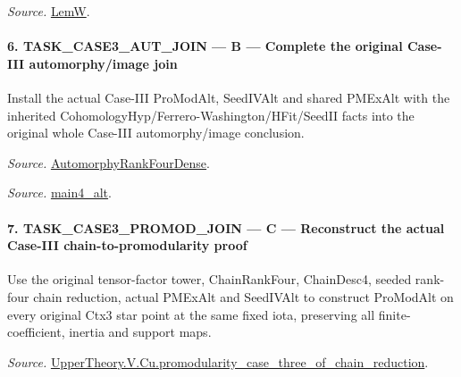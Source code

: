 \documentclass[11pt,a4paper]{article}
\numberwithin{equation}{section}
\theoremstyle{remark}\newtheorem{remark}[theorem]{Remark}
\begin{document}
\emph{Source.} \href{https://github.com/CocoSgt/riemann-hypothesis-lean/blob/7cbf7a0c32fca1badf05931879a37c3f8a2b03b4/src/Development/AutomorphicArithmetic/AutomorphicVarieties/AutomorphicCases/AutomorphyUnramifiedCoefficients.lean#L19-L22}{LemW}.



\paragraph{6. TASK\_\allowbreak CASE3\_\allowbreak AUT\_\allowbreak JOIN — B — Complete the original Case-III automorphy/image join}

Install the actual Case-III ProModAlt, SeedIVAlt and shared PMExAlt with the inherited CohomologyHyp/Ferrero-Washington/HFit/SeedII facts into the original whole Case-III automorphy/image conclusion.

\emph{Source.} \href{https://github.com/CocoSgt/riemann-hypothesis-lean/blob/7cbf7a0c32fca1badf05931879a37c3f8a2b03b4/src/Development/AutomorphicArithmetic/AutomorphicVarieties/ModularityArgument/ThresholdArguments/DenseThresholdCases/PromodularityCaseThree.lean#L43-L44}{AutomorphyRankFourDense}.

\emph{Source.} \href{https://github.com/CocoSgt/riemann-hypothesis-lean/blob/7cbf7a0c32fca1badf05931879a37c3f8a2b03b4/src/Development/AutomorphicArithmetic/AutomorphicVarieties/ModularityArgument/ThresholdArguments/DenseThresholdCases/CuFinal.lean#L44-L44}{main4\_\allowbreak alt}.



\paragraph{7. TASK\_\allowbreak CASE3\_\allowbreak PROMOD\_\allowbreak JOIN — C — Reconstruct the actual Case-III chain-to-promodularity proof}

Use the original tensor-factor tower, ChainRankFour, ChainDesc4, seeded rank-four chain reduction, actual PMExAlt and SeedIVAlt to construct ProModAlt on every original Ctx3 star point at the same fixed iota, preserving all finite-coefficient, inertia and support maps.

\emph{Source.} \href{https://github.com/CocoSgt/riemann-hypothesis-lean/blob/7cbf7a0c32fca1badf05931879a37c3f8a2b03b4/src/Development/AutomorphicArithmetic/AutomorphicVarieties/ModularityArgument/ThresholdArguments/DenseThresholdCases/PromodularityCaseThreeOfLemmas.lean#L131-L153}{UpperTheory.V.Cu.promodularity\_\allowbreak case\_\allowbreak three\_\allowbreak of\_\allowbreak chain\_\allowbreak reduction}.
\end{document}
